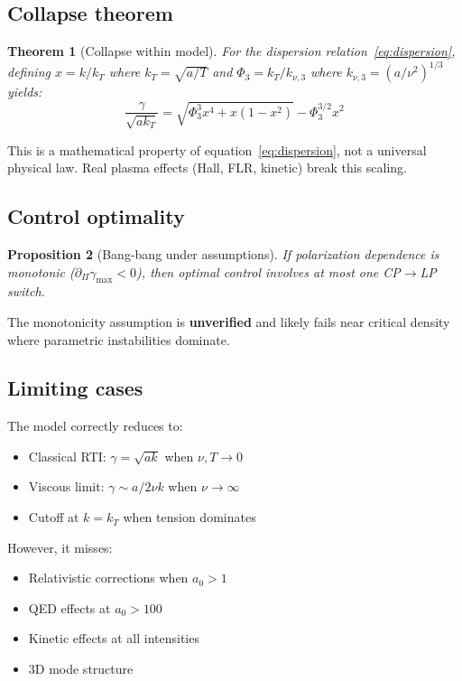 \documentclass[aps,pre,twocolumn,showpacs,superscriptaddress]{revtex4-2}
\newtheorem{theorem}{Theorem}
\newtheorem{proposition}[theorem]{Proposition}
\theoremstyle{definition}
\begin{document}
\subsection{Collapse theorem}

\begin{theorem}[Collapse within model]
\label{thm:collapse}
For the dispersion relation~\eqref{eq:dispersion}, defining $x = k/k_T$ where $k_T = \sqrt{a/T}$ and $\Phi_3 = k_T/k_{\nu,3}$ where $k_{\nu,3} = (a/\nu^2)^{1/3}$ yields:
\begin{equation}
\frac{\gamma}{\sqrt{ak_T}} = \sqrt{\Phi_3^3 x^4 + x(1-x^2)} - \Phi_3^{3/2} x^2
\label{eq:universal}
\end{equation}
\end{theorem}

This is a mathematical property of equation~\eqref{eq:dispersion}, not a universal physical law. Real plasma effects (Hall, FLR, kinetic) break this scaling.

\subsection{Control optimality}

\begin{proposition}[Bang-bang under assumptions]
\label{prop:bangbang}
If polarization dependence is monotonic ($\partial_\Pi\gamma_{\max} < 0$), then optimal control involves at most one CP$\to$LP switch.
\end{proposition}

The monotonicity assumption is \textbf{unverified} and likely fails near critical density where parametric instabilities dominate.

\subsection{Limiting cases}

The model correctly reduces to:
\begin{itemize}
\item Classical RTI: $\gamma = \sqrt{ak}$ when $\nu, T \to 0$
\item Viscous limit: $\gamma \sim a/2\nu k$ when $\nu \to \infty$
\item Cutoff at $k = k_T$ when tension dominates
\end{itemize}

However, it misses:
\begin{itemize}
\item Relativistic corrections when $a_0 > 1$
\item QED effects at $a_0 > 100$
\item Kinetic effects at all intensities
\item 3D mode structure
\end{itemize}
\end{document}
